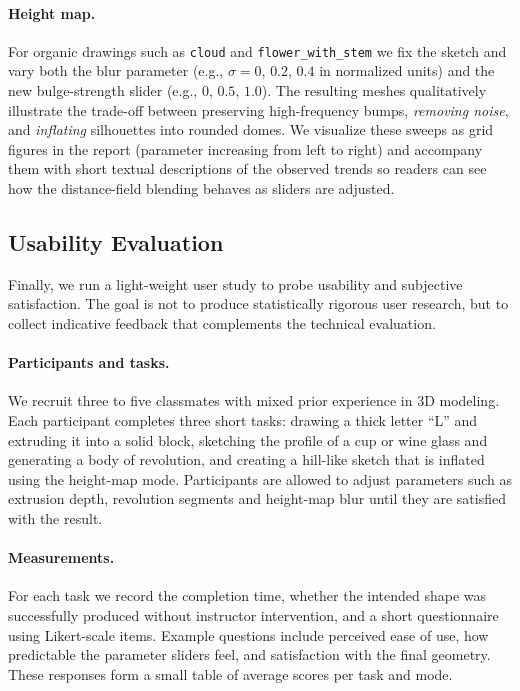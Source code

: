 \documentclass[11pt, a4paper]{article}
\begin{document}
\paragraph{Height map.} For organic drawings such as \texttt{cloud} and \texttt{flower\_with\_stem} we fix the sketch and vary both the blur parameter (e.g., $\sigma=0$, $0.2$, $0.4$ in normalized units) and the new bulge-strength slider (e.g., $0$, $0.5$, $1.0$). The resulting meshes qualitatively illustrate the trade-off between preserving high-frequency bumps, \emph{removing noise}, and \emph{inflating} silhouettes into rounded domes. We visualize these sweeps as grid figures in the report (parameter increasing from left to right) and accompany them with short textual descriptions of the observed trends so readers can see how the distance-field blending behaves as sliders are adjusted.


\subsection{Usability Evaluation}
Finally, we run a light-weight user study to probe usability and subjective satisfaction. The goal is not to produce statistically rigorous user research, but to collect indicative feedback that complements the technical evaluation.

\paragraph{Participants and tasks.} We recruit three to five classmates with mixed prior experience in 3D modeling. Each participant completes three short tasks: drawing a thick letter ``L'' and extruding it into a solid block, sketching the profile of a cup or wine glass and generating a body of revolution, and creating a hill-like sketch that is inflated using the height-map mode. Participants are allowed to adjust parameters such as extrusion depth, revolution segments and height-map blur until they are satisfied with the result.

\paragraph{Measurements.} For each task we record the completion time, whether the intended shape was successfully produced without instructor intervention, and a short questionnaire using Likert-scale items. Example questions include perceived ease of use, how predictable the parameter sliders feel, and satisfaction with the final geometry. These responses form a small table of average scores per task and mode.
\end{document}
